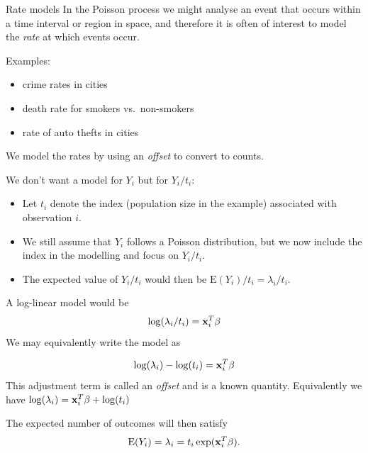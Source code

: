 \documentclass[
  ignorenonframetext,
]{beamer}
\providecommand{\tightlist}{%
  \setlength{\itemsep}{0pt}\setlength{\parskip}{0pt}}
\begin{document}
\begin{frame}{Rate models}
\protect\hypertarget{rate-models}{}
In the Poisson process we might analyse an event that occurs within a
time interval or region in space, and therefore it is often of interest
to model the \emph{rate} at which events occur.

Examples:

\begin{itemize}
\tightlist
\item
  crime rates in cities
\item
  death rate for smokers vs.~non-smokers
\item
  rate of auto thefts in cities
\end{itemize}

We model the rates by using an \emph{offset} to convert to counts.
\end{frame}

\begin{frame}
We don't want a model for \(Y_i\) but for \(Y_i/t_i\):

\begin{itemize}
\tightlist
\item
  Let \(t_i\) denote the index (population size in the example)
  associated with observation \(i\).
\item
  We still assume that \(Y_i\) follows a Poisson distribution, but we
  now include the index in the modelling and focus on \(Y_i/t_i\).
\item
  The expected value of \(Y_i/t_i\) would then be
  \(\text{E}(Y_i)/t_i=\lambda_i/t_i\).
\end{itemize}

A log-linear model would be \[ \log(\lambda_i/t_i)={\bf x}_i^T \beta\]
We may equivalently write the model as

\[
\log(\lambda_i)-\log(t_i)={\bf x}_i^T \beta
\] This adjustment term is called an \emph{offset} and is a known
quantity. Equivalently we have
\(\log(\lambda_i)={\bf x}_i^T \beta + \log(t_i)\)

The expected number of outcomes will then satisfy
\[ \text{E}(Y_i)=\lambda_i=t_i \exp({\bf x}_i^T \beta).\]
\end{frame}
\end{document}
